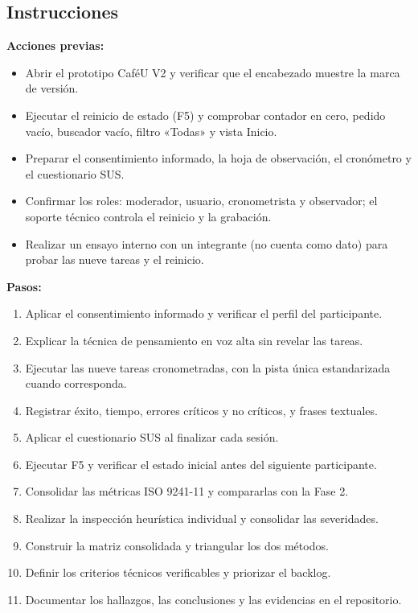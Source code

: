 \documentclass{article}
\begin{document}
\subsection{Instrucciones}
\textbf{Acciones previas:}
\begin{itemize}[leftmargin=1.5em, itemsep=2pt]
    \item Abrir el prototipo CaféU V2 y verificar que el encabezado muestre la marca de versión.
    \item Ejecutar el reinicio de estado (F5) y comprobar contador en cero, pedido vacío, buscador vacío, filtro «Todas» y vista Inicio.
    \item Preparar el consentimiento informado, la hoja de observación, el cronómetro y el cuestionario SUS.
    \item Confirmar los roles: moderador, usuario, cronometrista y observador; el soporte técnico controla el reinicio y la grabación.
    \item Realizar un ensayo interno con un integrante (no cuenta como dato) para probar las nueve tareas y el reinicio.
\end{itemize}

\textbf{Pasos:}
\begin{enumerate}[leftmargin=1.5em, itemsep=2pt]
    \item Aplicar el consentimiento informado y verificar el perfil del participante.
    \item Explicar la técnica de pensamiento en voz alta sin revelar las tareas.
    \item Ejecutar las nueve tareas cronometradas, con la pista única estandarizada cuando corresponda.
    \item Registrar éxito, tiempo, errores críticos y no críticos, y frases textuales.
    \item Aplicar el cuestionario SUS al finalizar cada sesión.
    \item Ejecutar F5 y verificar el estado inicial antes del siguiente participante.
    \item Consolidar las métricas ISO 9241-11 y compararlas con la Fase 2.
    \item Realizar la inspección heurística individual y consolidar las severidades.
    \item Construir la matriz consolidada y triangular los dos métodos.
    \item Definir los criterios técnicos verificables y priorizar el backlog.
    \item Documentar los hallazgos, las conclusiones y las evidencias en el repositorio.
\end{enumerate}
\end{document}
